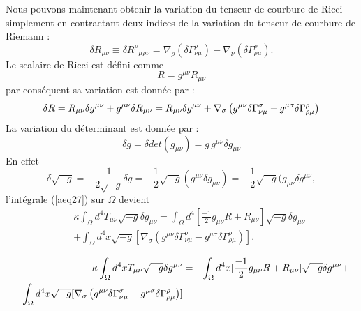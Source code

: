 \documentclass[a4paper,12pt]{report}
\theoremstyle{plain}
\theoremstyle{plain}
\begin{document}
Nous pouvons maintenant obtenir la variation du tenseur de courbure de Ricci simplement en contractant deux indices
 de la variation du tenseur de courbure de Riemann :
\begin{equation}
 \delta R_{\mu\nu} \equiv \delta R^\rho{}_{\mu\rho\nu} = \nabla_\rho 
(\delta \Gamma^\rho_{\nu\mu}) - \nabla_\nu (\delta 
\Gamma^\rho_{\rho\mu}).  \label{aeq33}
\end{equation}
Le scalaire de Ricci est d\'efini comme
\begin{equation}
    R = g^{\mu\nu} R_{\mu\nu} \label{aeq34}
\end{equation}
par cons\'equent sa variation est donn\'ee par :
\begin{equation}
    \delta R = R_{\mu\nu} \delta g^{\mu\nu} + 
g^{\mu\nu} \delta R_{\mu\nu}\\ 
  = R_{\mu\nu} \delta g^{\mu\nu} + 
\nabla_\sigma \left( g^{\mu\nu} \delta\Gamma^\sigma_{\nu\mu} - 
g^{\mu\sigma}\delta\Gamma^\rho_{\rho\mu} \right) \label{aeq35}
\end{equation}
 La variation du d\'eterminant est donn\'ee par : 
\begin{equation}
 \delta g = \delta det(g_{\mu\nu}) = g \,  g^{\mu\nu} \delta g_{\mu\nu} \label{aeq36}
\end{equation}
En effet
\begin{equation}
  \delta \sqrt{-g} = -\frac{1}{2\sqrt{-g}}\delta g = -\frac{1}{2} \sqrt{-g} (g^{\mu\nu} \delta g_{\mu\nu}) = -\frac{1}{2} \sqrt{-g} (g_{\mu\nu} \delta g^{\mu\nu}, \label{aeq37}
\end{equation}
l'int\'egrale (\ref{aeq27}) sur $\Omega$ devient
 \begin{eqnarray}
&& \kappa \int_{\Omega}d^{4} T_{\mu\nu}\sqrt{-g}\delta g_{\mu\nu} =\int_{\Omega}d^{4} [\frac{-1}{2} g_{\mu\nu}R+R_{\mu\nu}]\sqrt{-g}\delta 
 g_{\mu\nu} \\ 
&& +\int_{\Omega}d^{4}x \sqrt{-g}[\nabla_\sigma \left( g^{\mu\nu} \delta\Gamma^\sigma_{\nu\mu} - 
g^{\mu\sigma}\delta\Gamma^\rho_{\rho\mu} \right)].   \label{aeq38}
\end{eqnarray}

\begin{eqnarray}
\kappa \int_{\Omega}d^{4}x T_{\mu\nu}\sqrt{-g}\delta g^{\mu\nu} &=&\int_{\Omega}d^{4}x [\frac{-1}{2} g_{\mu\nu}R+R_{\mu\nu}]\sqrt{-g}\delta 
  g^{\mu\nu}+ \cr
+\int_{\Omega}d^{4}x \sqrt{-g}[\nabla_\sigma \left( g^{\mu\nu} \delta\Gamma^\sigma_{\nu\mu} - 
 g^{\mu\sigma}\delta\Gamma^\rho_{\rho\mu} \right)]\label{aeq38}
\end{eqnarray}
\end{document}
